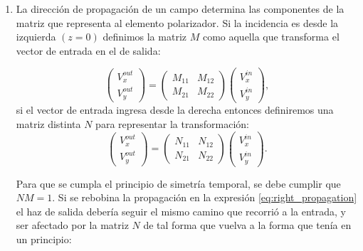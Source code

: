 \begin{enumerate}
\item La dirección de propagación de un campo determina las
  componentes de la matriz que representa al elemento polarizador. Si
  la incidencia es desde la izquierda $(z=0)$ definimos la matriz $M$ como aquella
  que transforma el vector de entrada en el de salida:

  \begin{equation}
    \begin{pmatrix}
      V_x^{out}\\V_y^{out}
    \end{pmatrix}
    =
    \begin{pmatrix}
      M_{11}&M_{12}\\M_{21} & M_{22}
    \end{pmatrix}
    \begin{pmatrix}
      V_x^{in}\\V_y^{in}
    \end{pmatrix},
    \label{eq:right_propagation}
  \end{equation}
si el vector de entrada ingresa desde la derecha entonces
definiremos una matriz distinta $N$ para representar la transformación:
  \begin{equation*}
    \begin{pmatrix}
      V_x^{out}\\V_y^{out}
    \end{pmatrix}
    =
    \begin{pmatrix}
      N_{11}&N_{12}\\N_{21} & N_{22}
    \end{pmatrix}
    \begin{pmatrix}
      V_x^{in}\\V_y^{in}
    \end{pmatrix}.
  \end{equation*}

Para que se cumpla el principio de simetría temporal, se debe cumplir
que $NM=1$. Si se rebobina la propagación en la expresión
\ref{eq:right_propagation} el haz de salida 
debería seguir el mismo camino que recorrió a la entrada, y ser
afectado por la matriz $N$ de tal forma que vuelva a la forma que
tenía en un principio: 


\end{enumerate}
